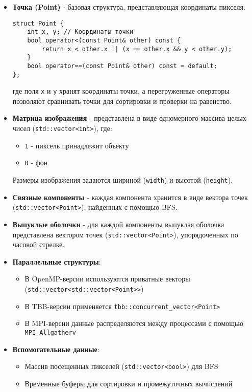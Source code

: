 \documentclass[12pt]{article}
\begin{document}
\begin{itemize}
    \item \textbf{Точка (Point)} - базовая структура, представляющая координаты пикселя:
    \begin{verbatim}
struct Point {
    int x, y; // Координаты точки
    bool operator<(const Point& other) const {
        return x < other.x || (x == other.x && y < other.y);
    }
    bool operator==(const Point& other) const = default;
};
    \end{verbatim}
    где поля \texttt{x} и \texttt{y} хранят координаты точки, а перегруженные операторы позволяют сравнивать точки для сортировки и проверки на равенство.

    \item \textbf{Матрица изображения} - представлена в виде одномерного массива целых чисел (\texttt{std::vector<int>}), где:
    \begin{itemize}
        \item \texttt{1} - пиксель принадлежит объекту
        \item \texttt{0} - фон
    \end{itemize}
    Размеры изображения задаются шириной (\texttt{width}) и высотой (\texttt{height}).

    \item \textbf{Связные компоненты} - каждая компонента хранится в виде вектора точек (\texttt{std::vector<Point>}), найденных с помощью BFS.

    \item \textbf{Выпуклые оболочки} - для каждой компоненты выпуклая оболочка представлена вектором точек (\texttt{std::vector<Point>}), упорядоченных по часовой стрелке.

    \item \textbf{Параллельные структуры}:
    \begin{itemize}
        \item В OpenMP-версии используются приватные векторы (\texttt{std::vector<std::vector<Point>>})
        \item В TBB-версии применяется \texttt{tbb::concurrent\_vector<Point>}
        \item В MPI-версии данные распределяются между процессами с помощью \texttt{MPI\_Allgatherv}
    \end{itemize}

    \item \textbf{Вспомогательные данные}:
    \begin{itemize}
        \item Массив посещенных пикселей (\texttt{std::vector<bool>}) для BFS
        \item Временные буферы для сортировки и промежуточных вычислений
    \end{itemize}
\end{itemize}
\end{document}
